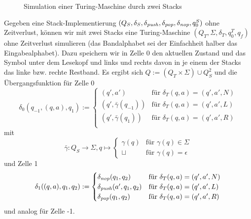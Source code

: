\documentclass{article}
\begin{document}
\begin{beispiel}
    \begin{figure}[h]
        \centering
        \caption{Simulation einer Turing-Maschine durch zwei Stacks}
    \end{figure}
    Gegeben eine Stack-Implementierung $(Q_S, \delta_S, \delta_{\mathit{push}}, \delta_{\mathit{pop}}, \delta_{\mathit{nop}}, q^S_0)$ ohne Zeitverlust, können wir mit zwei Stacks eine Turing-Maschine $(Q_T, \Sigma, \delta_T, q^T_0, q_f)$ ohne Zeitverlust simulieren (das Bandalphabet sei der Einfachheit halber das Eingabealphabet). Dazu speichern wir in Zelle 0  den aktuellen Zustand und das Symbol unter dem Lesekopf und links und rechts davon in je einem der Stacks das linke bzw. rechte Restband. Es ergibt sich $Q := (Q_T \times \Sigma) \cup Q^2_S$ und die Übergangsfunktion für Zelle 0
    \[ \delta_0(q_{-1}, (q, a), q_1) :=
        \begin{cases}
            (q', a') &\text{für } \delta_T(q, a) = (q', a', N) \\
            (q', \bar\gamma(q_{-1})) &\text{für } \delta_T(q, a) = (q', a', L) \\
            (q', \bar\gamma(q_1)) &\text{für } \delta_T(q, a) = (q', a', R) \\
    \end{cases} \]
    mit
    \[ \bar\gamma : Q_S \rightarrow \Sigma, q \mapsto \begin{cases}
            \gamma(q) &\text{für } \gamma(q) \in \Sigma \\
            \sqcup &\text{für } \gamma(q) = \epsilon
    \end{cases} \]
    und Zelle 1
    \[ \delta_1((q, a), q_1, q_2) :=
        \begin{cases}
            \delta_{\mathit{nop}}(q_1, q_2) &\text{für } \delta_T(q, a) = (q', a', N) \\
            \delta_{\mathit{push}}(a', q_1, q_2) &\text{für } \delta_T(q, a) = (q', a', L) \\
            \delta_{\mathit{pop}}(q_1, q_2) &\text{für } \delta_T(q, a) = (q', a', R) \\
    \end{cases} \]
    und analog für Zelle -1.
\end{beispiel}
\end{document}
